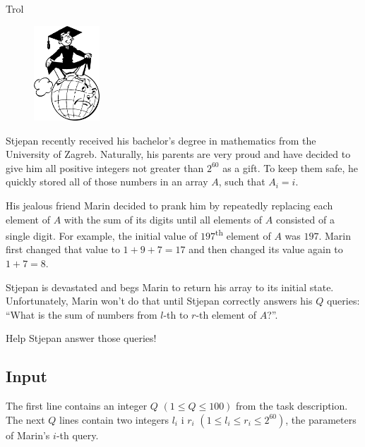 \begin{statement}[
  problempoints=50,
  timelimit=1 second,
  memorylimit=512 MiB,
]{Trol}

\setlength\intextsep{-0.1cm}
\begin{figure}
\centering
\includegraphics[width=0.22\textwidth]{img/diploma.png}
\end{figure}


Stjepan recently received his bachelor's degree in mathematics from the
University of Zagreb. Naturally, his parents are very proud and have decided
to give him all positive integers not greater than $2^{60}$ as a gift. To keep
them safe, he quickly stored all of those numbers in an array $A$, such that
$A_i = i$.

His jealous friend Marin decided to prank him by repeatedly replacing each
element of $A$ with the sum of its digits until all elements of $A$ consisted
of a single digit. For example, the initial value of $197$\textsuperscript{th}
element of $A$ was $197$. Marin first changed that value to $1 + 9 + 7 = 17$ and
then changed its value again to $1 + 7 = 8$.

Stjepan is devastated and begs Marin to return his array to its initial state.
Unfortunately, Marin won't do that until Stjepan correctly answers his $Q$
queries: ``What is the sum of numbers from $l$-th to $r$-th element of $A$?''.

Help Stjepan answer those queries!

\subsection*{Input}
The first line contains an integer $Q$ $(1 \le Q \le 100)$ from the task
description. \\
The next $Q$ lines contain two integers $l_i$ i $r_i$
$(1 \le l_i \le r_i \le 2^{60})$, the parameters of Marin's $i$-th query.


\end{statement}
